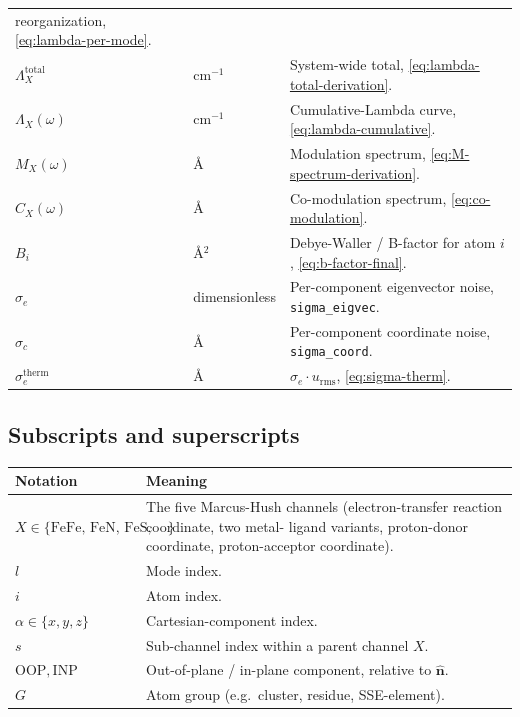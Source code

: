 \documentclass[10pt,a4paper,twoside]{article}
\newcommand{\nhat}{\hat{\mathbf{n}}}
\newcommand{\urms}{u_{\mathrm{rms}}}
\newcommand{\OOP}{\mathrm{OOP}}
\newcommand{\INP}{\mathrm{INP}}
\newcommand{\cfgkey}[1]{\texttt{#1}}
\begin{document}
\begin{longtable}{p{} p{} p{}}
                                        reorganization,
                                        \cref{eq:lambda-per-mode}. \\
$\Lambda_X^\text{total}$ & cm$^{-1}$ & System-wide total,
                                        \cref{eq:lambda-total-derivation}. \\
$\Lambda_X(\omega)$ & cm$^{-1}$ & Cumulative-Lambda curve,
                                   \cref{eq:lambda-cumulative}. \\
$M_X(\omega)$ & \AA{} & Modulation spectrum,
                          \cref{eq:M-spectrum-derivation}. \\
$C_X(\omega)$ & \AA{} & Co-modulation spectrum,
                          \cref{eq:co-modulation}. \\
$B_i$ & \AA$^2$ & Debye-Waller / B-factor for atom $i$,
                    \cref{eq:b-factor-final}. \\
$\sigma_e$ & dimensionless & Per-component eigenvector noise,
                                \cfgkey{sigma\_eigvec}. \\
$\sigma_c$ & \AA{} & Per-component coordinate noise,
                       \cfgkey{sigma\_coord}. \\
$\sigma_e^\text{therm}$ & \AA{} & $\sigma_e \cdot \urms$,
                                   \cref{eq:sigma-therm}. \\
\bottomrule
\end{longtable}

\subsection*{Subscripts and superscripts}

\begin{longtable}{p{} p{}}
\toprule
\textbf{Notation} & \textbf{Meaning} \\
\midrule
$X \in \{\text{FeFe, FeN, FeS, NH, HA}\}$ & The five Marcus-Hush
   channels (electron-transfer reaction coordinate, two metal-
   ligand variants, proton-donor coordinate, proton-acceptor
   coordinate). \\
$l$ & Mode index. \\
$i$ & Atom index. \\
$\alpha \in \{x, y, z\}$ & Cartesian-component index. \\
$s$ & Sub-channel index within a parent channel $X$. \\
$\OOP, \INP$ & Out-of-plane / in-plane component, relative to
                $\nhat$. \\
$G$ & Atom group (e.g.\ cluster, residue, SSE-element). \\
\bottomrule
\end{longtable}
\end{document}
